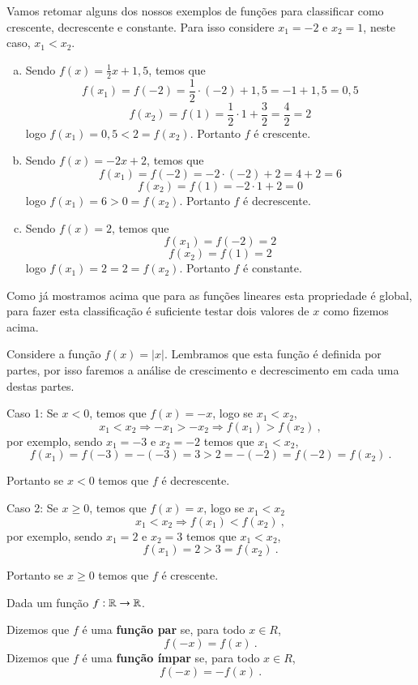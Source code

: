 \begin{exem}
 Vamos retomar alguns dos nossos exemplos de funções para classificar como crescente, decrescente e constante. Para isso considere $x_1= -2$ e $x_2= 1$, neste caso, $x_1 < x_2$.
  \begin{enumerate}[a)]
   \item Sendo $f(x)= \frac{1}{2}x + 1,5$, temos que
   \[f(x_1)= f(-2)= \frac{1}{2}\cdot (-2) + 1,5= -1 + 1,5= 0,5\]
   \[f(x_2)= f(1)= \frac{1}{2} \cdot 1+\frac{3}{2}= \frac{4}{2}= 2\]
   logo $f(x_1)= 0,5 < 2= f(x_2)$. Portanto $f$ é crescente.
   \item Sendo $f(x)= -2x + 2$, temos que
   \[f(x_1)= f(-2)= -2 \cdot (-2) + 2= 4 + 2= 6\]
   \[f(x_2)= f(1)= -2 \cdot 1 + 2= 0\]
   logo $f(x_1)= 6 > 0 = f(x_2)$. Portanto $f$ é decrescente.
   \item Sendo $f(x)= 2$, temos que
   \[f(x_1)= f(-2)= 2\]
   \[f(x_2)= f(1)= 2\]
   logo $f(x_1)= 2 = 2= f(x_2)$. Portanto $f$ é constante.
  \end{enumerate}
  Como já mostramos acima que para as funções lineares esta propriedade é global, para fazer esta classificação é suficiente testar dois valores de $x$ como fizemos acima.

 \end{exem}

 \begin{exem}
  Considere a função $f(x)= |x|$. Lembramos que esta função é definida por partes, por isso faremos a análise de crescimento e decrescimento em cada uma destas partes.

  Caso 1: Se $x < 0$, temos que $f(x)= -x$, logo se $x_1 < x_2$,
  \[x_1 < x_2 \Rightarrow -x_1 > -x_2 \Rightarrow f(x_1) > f(x_2) \ ,\]
  por exemplo, sendo $x_1= -3$ e $x_2= -2$ temos que $x_1 < x_2$,
  \[f(x_1)= f(-3)= -(-3)= 3 > 2= -(-2)= f(-2)= f(x_2) \ .\]

  Portanto se $x < 0$ temos que $f$ é decrescente.

  Caso 2: Se $x \geq 0$, temos que $f(x)= x$, logo se $x_1 < x_2$
  \[x_1 < x_2 \Rightarrow  f(x_1) < f(x_2) \ ,\]
  por exemplo, sendo $x_1= 2$ e $x_2= 3$ temos que $x_1 < x_2$,
  \[f(x_1)= 2 > 3= f(x_2) \ .\]

  Portanto se $x \geq 0$ temos que $f$ é crescente.
 \end{exem}



 \vskip0.3cm
 \colorbox{azul}{
 \begin{minipage}{0.9\linewidth}
 \begin{center}
  Dada um função $f: \mathbb{R} \rightarrow \mathbb{R}$.

  Dizemos que $f$ é uma \textbf{função par} se, para todo $x \in R$,
  \[f(-x)= f(x) \ .\]
  Dizemos que $f$ é uma \textbf{função ímpar} se, para todo $x \in R$,
  \[f(-x)= - f(x) \ .\]
 \end{center}
 \end{minipage}}
 \vskip0.3cm


